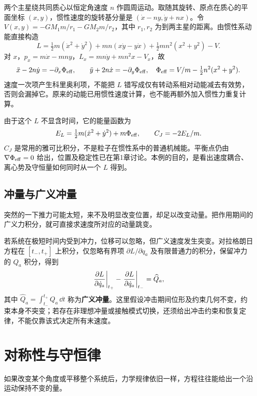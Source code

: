 \begin{example}
两个主星绕共同质心以恒定角速度 $n$ 作圆周运动。取随其旋转、原点在质心的平面坐标 $(x,y)$，惯性速度的旋转基分量是 $(\dot x-ny,\dot y+nx)$。令 $V(x,y)=-GM_1m/r_1-GM_2m/r_2$，其中 $r_1,r_2$ 为到两主星的距离。由惯性系动能直接构造
\[
L=\tfrac12m(\dot x^2+\dot y^2)+mn(x\dot y-y\dot x)
+\tfrac12mn^2(x^2+y^2)-V.
\]
对 $x$，$p_x=m\dot x-mny$，$L_x=mn\dot y+mn^2x-V_x$，故
\[
\ddot x-2n\dot y=-\partial_x\Phi_{\rm eff},\qquad
\ddot y+2n\dot x=-\partial_y\Phi_{\rm eff},
\quad \Phi_{\rm eff}=V/m-\tfrac12n^2(x^2+y^2).
\]
速度一次项产生科里奥利项，不能把 $L$ 错写成仅有转动系相对动能减去有效势，否则会漏掉它。原来的动能已用惯性速度计算，也不能再额外加入惯性力重复计算。

由于这个 $L$ 不显含时间，它的能量函数为
\[
E_L=\tfrac12m(\dot x^2+\dot y^2)+m\Phi_{\rm eff},\qquad
C_J=-2E_L/m.
\]
$C_J$ 是常用的雅可比积分，不是粒子在惯性系中的普通机械能。平衡点仍由 $\nabla\Phi_{\rm eff}=0$ 给出，位置及稳定性已在第1章讨论。本例的目的，是看出速度耦合、离心势及守恒量如何同时从一个 $L$ 得到。
\end{example}

\subsection{冲量与广义冲量}

突然的一下推力可能太短，来不及明显改变位置，却足以改变动量。把作用期间的广义力积分，就可直接求速度所对应的动量跳变。

若系统在极短时间内受到冲力，位移可以忽略，但广义速度发生突变。对拉格朗日方程在 $[t_-,t_+]$ 上积分，仅忽略有界项 $\partial L/\partial q_a$ 及有限普通力的积分，保留冲力的 $Q_a$ 积分，得到
\begin{equation}
\left.\frac{\partial L}{\partial \dot q_a}\right|_{t_+}
-\left.\frac{\partial L}{\partial \dot q_a}\right|_{t_-}
=\widehat Q_a,
\label{eq:impulsive-lagrange}
\end{equation}
其中 $\widehat Q_a=\int_{t_-}^{t_+}Q_a\,\dd t$ 称为\textbf{广义冲量}。这里假设冲击期间位形及约束几何不变，约束本身不突变；若存在非理想冲量或接触模式切换，还须给出冲击约束和恢复定律，不能仅靠该式决定所有末速度。

\section{对称性与守恒律}

如果改变某个角度或平移整个系统后，力学规律依旧一样，方程往往能给出一个沿运动保持不变的量。

